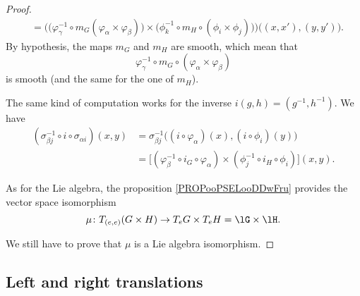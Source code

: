 \begin{proof}
\begin{subequations}
\begin{align}
			                                                                              & =\Big( \big( \varphi_{\gamma}^{-1}\circ m_G(\varphi_{\alpha}\times \varphi_{\beta}) \big)\times \big( \phi_k^{-1}\circ m_H\circ (\phi_i\times \phi_j) \big) \Big)\big( (x,x'),(y,y') \big).
		\end{align}
	\end{subequations}
	By hypothesis, the maps \( m_G\) and \( m_H\) are smooth, which mean that
	\begin{equation}
		\varphi_{\gamma}^{-1}\circ m_G\circ(\varphi_{\alpha}\times \varphi_{\beta})
	\end{equation}
	is smooth (and the same for the one of \( m_H\)).

	The same kind of computation works for the inverse \( i(g,h)=(g^{-1},h^{-1})\). We have
	\begin{subequations}
		\begin{align}
			(\sigma_{\beta j}^{-1}\circ i\circ\sigma_{\alpha i})(x,y) & =\sigma_{\beta j}^{-1}\big( (i\circ\varphi_{\alpha})(x),(i\circ\phi_i)(y) \big)                                     \\
			                                                          & = \big[  (\varphi_{\beta}^{-1}\circ i_G\circ \varphi_{\alpha})\times (\phi_j^{-1}\circ i_H\circ\phi_i)  \big](x,y).
		\end{align}
	\end{subequations}

	As for the Lie algebra, the proposition \ref{PROPooPSELooDDwFru} provides the vector space isomorphism
	\begin{equation}
		\mu \colon T_{(e,e)}(G\times H)\to T_eG\times T_eH=\lG\times \lH.
	\end{equation}

	We still have to prove that \( \mu\) is a Lie algebra isomorphism.
\end{proof}

\subsection{Left and right translations}

